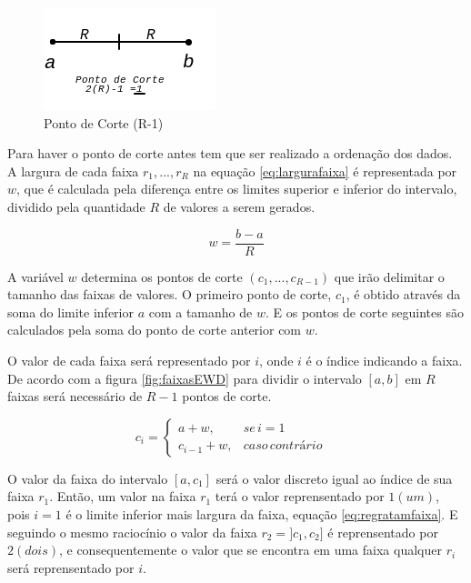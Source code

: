 \begin{figure}[h]
        \centering
        \includegraphics[scale=1]{figs/faixaA-B_PontoCorte.png}
        \caption{Ponto de Corte (R-1)} \label{fig:pontocorte}
\end{figure}

Para haver o ponto de corte antes tem que ser realizado a ordenação dos dados. A largura de cada faixa ${r_1,...,r_R}$ na equação \ref{eq:largurafaixa} é representada por ${w}$, que é calculada pela diferença entre os limites superior e inferior do intervalo, dividido pela quantidade ${R}$ de valores a serem gerados.

\begin{equation}
 w = \frac{b-a}{R}
 \label{eq:largurafaixa}
\end{equation}

A variável ${w}$ determina os pontos de corte ${(c_1,...,c_{R-1})}$ que irão delimitar o tamanho das faixas de valores. O primeiro ponto de corte, ${c_1}$, é obtido através da soma do limite inferior ${a}$ com a tamanho de ${w}$. E os pontos de corte seguintes são calculados pela soma do ponto de corte anterior com ${w}$.


O valor de cada faixa será representado por ${i}$, onde ${i}$ é o índice indicando a faixa. De acordo com a figura \ref{fig:faixasEWD} para dividir o intervalo ${[a,b]}$ em ${R}$ faixas será necessário de ${R-1}$ pontos de corte.

\begin{equation}
c_i=\left\{\begin{matrix}
a+w, & se\, i=1 & \\ 
c_{i-1}+w,  & caso\, contrário & 
\end{matrix}\right.
 \label{eq:regratamfaixa}
\end{equation}

O valor da faixa do intervalo ${[a,c_1]}$ será o valor discreto igual ao índice de sua faixa ${r_1}$. Então, um valor na faixa ${r_1}$ terá o valor reprensentado por ${1(um)}$, pois  ${i=1}$ é o limite inferior mais largura da faixa, equação \ref{eq:regratamfaixa}. E seguindo o mesmo raciocínio o valor da faixa ${r_2=]c_1,c_2]}$ é reprensentado por ${2(dois)}$, e consequentemente o valor que se encontra em uma faixa qualquer ${r_i}$ será reprensentado por ${i}$.

